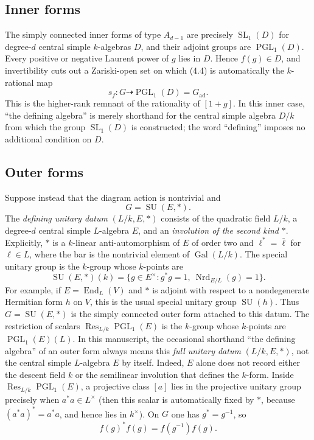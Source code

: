\documentclass[11pt,reqno]{amsart}
\theoremstyle{definition}
\theoremstyle{remark}
\newcommand{\Nrd}{\operatorname{Nrd}}
\newcommand{\Gal}{\operatorname{Gal}}
\newcommand{\SL}{\operatorname{SL}}
\newcommand{\PGL}{\operatorname{PGL}}
\newcommand{\SU}{\operatorname{SU}}
\newcommand{\End}{\operatorname{End}}
\newcommand{\aad}{\mathrm{ad}}
\begin{document}
\subsection{Inner forms}

The simply connected inner forms of type \(A_{d-1}\) are precisely
\(\SL_1(D)\) for degree-\(d\) central simple \(k\)-algebras \(D\), and their
adjoint groups are \(\PGL_1(D)\).  Every positive or negative Laurent power
of \(g\) lies in \(D\).  Hence \(f(g)\in D\), and invertibility cuts out a
Zariski-open set on which (4.4) is automatically the \(k\)-rational map
\[
 s_f:G\dashrightarrow\PGL_1(D)=G_{\aad}.
\tag{4.5}
\]
This is the higher-rank remnant of the rationality of \([1+g]\).
In this inner case, ``the defining algebra'' is merely shorthand for the
central simple algebra \(D/k\) from which the group \(\SL_1(D)\) is
constructed; the word ``defining'' imposes no additional condition on
\(D\).

\subsection{Outer forms}

Suppose instead that the diagram action is nontrivial and
\[
 G=\SU(E,*).
\]
The \emph{defining unitary datum} \((L/k,E,*)\) consists of the quadratic
field \(L/k\), a degree-\(d\) central simple \(L\)-algebra \(E\), and an
\emph{involution of the second kind} \(*\).  Explicitly, \(*\) is a
\(k\)-linear anti-automorphism of \(E\) of order two and
\(\ell^*=\bar\ell\) for \(\ell\in L\), where the bar is the nontrivial
element of \(\Gal(L/k)\).  The special unitary group is the \(k\)-group
whose \(k\)-points are
\[
 \SU(E,*)(k)=
 \{g\in E^\times:g^*g=1,\ \Nrd_{E/L}(g)=1\}.
\]
For example, if \(E=\End_L(V)\) and \(*\) is adjoint with respect to a
nondegenerate Hermitian form \(h\) on \(V\), this is the usual special
unitary group \(\SU(h)\).
Thus \(G=\SU(E,*)\) is the simply connected outer form attached to this
datum.  The restriction of scalars
\(\operatorname{Res}_{L/k}\PGL_1(E)\) is the \(k\)-group whose \(k\)-points
are \(\PGL_1(E)(L)\).
In this manuscript, the occasional shorthand ``the defining algebra'' of an
outer form always means this \emph{full unitary datum} \((L/k,E,*)\),
not the central simple \(L\)-algebra \(E\) by itself.  Indeed, \(E\) alone
does not record either the descent field \(k\) or the semilinear involution
that defines the \(k\)-form.
Inside \(\operatorname{Res}_{L/k}\PGL_1(E)\), a projective class \([a]\)
lies in the projective unitary group precisely when \(a^*a\in L^\times\)
(then this scalar is automatically fixed by \(*\), because
\((a^*a)^*=a^*a\), and hence lies in \(k^\times\)).  On \(G\) one has
\(g^*=g^{-1}\), so
\[
 f(g)^*f(g)=f(g^{-1})f(g).
\tag{4.6}
\]
\end{document}
